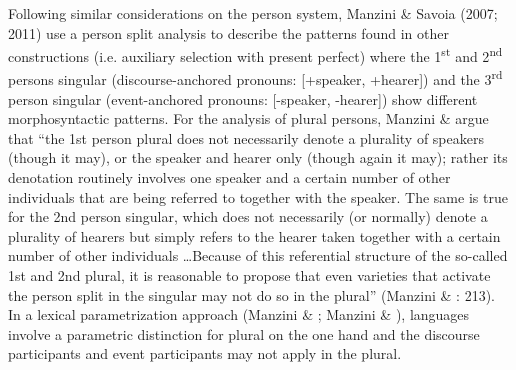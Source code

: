 \documentclass[output=paper]{langsci/langscibook}
\begin{document}
Following similar considerations on the person system, Manzini \& Savoia (2007; 2011) use a person split analysis to describe the patterns found in other constructions (i.e. auxiliary selection with present perfect) where the 1\textsuperscript{st} and 2\textsuperscript{nd} persons singular (discourse-anchored pronouns: [+speaker, +hearer]) and the 3\textsuperscript{rd} person singular (event-anchored pronouns: [-speaker, -hearer]) show different morphosyntactic patterns. For the analysis of plural persons, Manzini \& \citet{Savoia2011} argue that “the 1st person plural does not necessarily denote a plurality of speakers (though it may), or the speaker and hearer only (though again it may); rather its denotation routinely involves one speaker and a certain number of other individuals that are being referred to together with the speaker. The same is true for the 2nd person singular, which does not necessarily (or normally) denote a plurality of hearers but simply refers to the hearer taken together with a certain number of other individuals …Because of this referential structure of the so-called 1st and 2nd plural, it is reasonable to propose that even varieties that activate the person split in the singular may not do so in the plural” (Manzini \& \citealt{Savoia2011}: 213). In a lexical parametrization approach (Manzini \& \citealt{Wexler1988}; Manzini \& \citealt{Savoia2011}), languages involve a parametric distinction for plural on the one hand and the discourse participants and event participants may not apply in the plural. 
\end{document}
